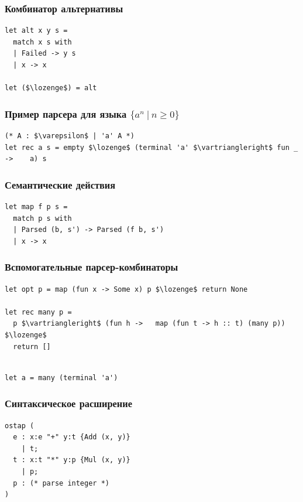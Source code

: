 \documentclass{beamer}
\begin{document}
\begin{frame}[fragile]
  \transwipe[direction=90]
  \frametitle{Комбинатор альтернативы}  
\begin{lstlisting}[frame=single]  
let alt x y s =
  match x s with
  | Failed -> y s
  | x -> x

let ($\lozenge$) = alt
\end{lstlisting}
\end{frame}


\begin{frame}[fragile]
  \transwipe[direction=90]
  \frametitle{Пример парсера для языка $\{ a^n \ | \ n \geq 0 \}$}  
\begin{lstlisting}[frame=single]  
(* A : $\varepsilon$ | 'a' A *)
let rec a s = empty $\lozenge$ (terminal 'a' $\vartriangleright$ fun _ ->    a) s
\end{lstlisting}
\end{frame}


\begin{frame}[fragile]
  \transwipe[direction=90]
  \frametitle{Семантические действия}  
\begin{lstlisting}[frame=single]  
let map f p s = 
  match p s with
  | Parsed (b, s') -> Parsed (f b, s')
  | x -> x
\end{lstlisting}
\end{frame}

\begin{frame}[fragile]
  \transwipe[direction=90]
  \frametitle{Вспомогательные парсер-комбинаторы}  
\begin{lstlisting}[frame=single]  
let opt p = map (fun x -> Some x) p $\lozenge$ return None
    
let rec many p =
  p $\vartriangleright$ (fun h ->   map (fun t -> h :: t) (many p)) $\lozenge$ 
  return []
    
\end{lstlisting}

\begin{lstlisting}[frame=single]  
let a = many (terminal 'a')
\end{lstlisting}
\end{frame}

\begin{frame}[fragile]
  \transwipe[direction=90]
  \frametitle{Синтаксическое расширение}  
\begin{lstlisting}[frame=single]  
ostap (
  e : x:e "+" y:t {Add (x, y)} 
    | t; 
  t : x:t "*" y:p {Mul (x, y)} 
    | p;
  p : (* parse integer *)
)
\end{lstlisting}
\end{frame}
\end{document}
